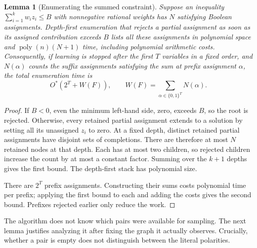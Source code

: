 \documentclass[11pt,a4paper]{article}
\newtheorem{lemma}[theorem]{Lemma}
\theoremstyle{definition}
\theoremstyle{remark}
\newcommand{\Ostar}{O^{*}}
\newcommand{\bits}{\{0,1\}}
\begin{document}
\begin{lemma}[Enumerating the summed constraint]\label{lem:enumeration}
Suppose an inequality $\sum_{i=1}^k w_i z_i\le B$ with nonnegative rational
weights has $N$ satisfying Boolean assignments. Depth-first enumeration
that rejects a partial assignment as soon as its assigned contribution
exceeds $B$ lists all these assignments in polynomial space and
$\operatorname{poly}(n)(N+1)$ time, including polynomial arithmetic costs.
Consequently, if learning is stopped after the first $T$ variables in a
fixed order, and $N(\alpha)$ counts the suffix assignments satisfying the
sum at prefix assignment $\alpha$, the total enumeration time is
\begin{equation}
 \Ostar(2^T+W(F)),\qquad
 W(F)=\sum_{\alpha\in\bits^T}N(\alpha).
 \label{eq:enumerationcost}
\end{equation}
\end{lemma}
\begin{proof}
If $B<0$, even the minimum left-hand side, zero, exceeds $B$, so the root
is rejected. Otherwise, every retained partial assignment extends to a
solution by setting all its unassigned $z_i$ to zero. At a fixed depth,
distinct retained partial assignments have disjoint sets of completions.
There are therefore at most $N$ retained nodes at that depth. Each has at
most two children, so rejected children increase the count by at most a
constant factor. Summing over the $k+1$ depths gives the first bound.
The depth-first stack has polynomial size.

There are $2^T$ prefix assignments. Constructing their sums costs polynomial
time per prefix; applying the first bound to each and adding the costs
gives the second bound. Prefixes rejected earlier only reduce the work.
\end{proof}

The algorithm does not know which pairs were available for sampling. The
next lemma justifies analyzing it after fixing the graph it actually
observes. Crucially, whether a pair is empty does not distinguish between
the literal polarities.
\end{document}
